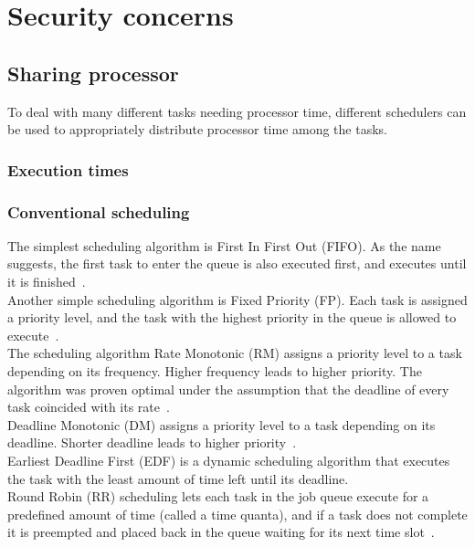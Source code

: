 \section{Security concerns}

\subsection{Sharing processor}
To deal with many different tasks needing processor time, different schedulers can be used to appropriately distribute processor time among the tasks.

\subsubsection{Execution times}

\subsubsection{Conventional scheduling}
The simplest scheduling algorithm is First In First Out (FIFO). As the name suggests, the first task to enter the queue is also executed first, and executes until it is finished~\cite{remzi2015}.\\

Another simple scheduling algorithm is Fixed Priority (FP). Each task is assigned a priority level, and the task with the highest priority in the queue is allowed to execute~\cite{liulayland1973}.\\

The scheduling algorithm Rate Monotonic (RM) assigns a priority level to a task depending on its frequency. Higher frequency leads to higher priority. The algorithm was proven optimal under the assumption that the deadline of every task coincided with its rate~\cite{liulayland1973}.\\

Deadline Monotonic (DM) assigns a priority level to a task depending on its deadline. Shorter deadline leads to higher priority~\cite{liulayland1973}.\\

Earliest Deadline First (EDF) is a dynamic scheduling algorithm that executes the task with the least amount of time left until its deadline.\\

Round Robin (RR) scheduling lets each task in the job queue execute for a predefined amount of time (called a time quanta), and if a task does not complete it is preempted and placed back in the queue waiting for its next time slot~\cite{kleinrock1964}.

